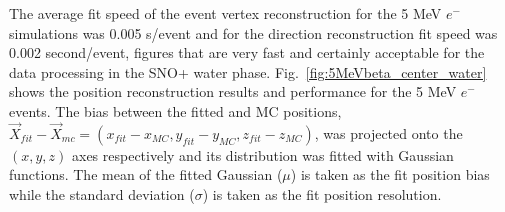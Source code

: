The average fit speed of the event vertex reconstruction for the 5 MeV $e^-$ simulations was 0.005 s/event and for the direction reconstruction fit speed was 0.002 second/event, figures that are very fast and certainly acceptable for the data processing in the SNO+ water phase. Fig.~\ref{fig:5MeVbeta_center_water} shows the position reconstruction results and performance for the 5 MeV $e^-$ events. The bias between the fitted and MC positions, $\vec{X}_{fit}-\vec{X}_{mc}=(x_{fit}-x_{MC},y_{fit}-y_{MC},z_{fit}-z_{MC})$, was projected onto the $(x,y,z)$ axes respectively and its distribution was fitted with Gaussian functions. The mean of the fitted Gaussian ($\mu$) is taken as the fit position bias while the standard deviation ($\sigma$) is taken as the fit position resolution.
\begin{figure}[htbp]
	\centering 
\end{figure}
